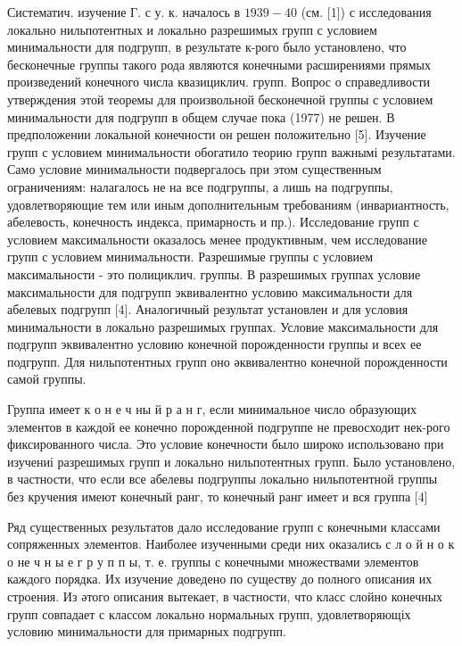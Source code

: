 \documentclass[10pt]{article}
\begin{document}
Систематич. изучение Г. с у. к. началось в $1939-40$ (см. [1]) с исследования локально нильпотентных и локально разрешимых групп с условием минимальности для подгрупп, в результате к-рого было установлено, что бесконечные группы такого рода являются конечными расширениями прямых произведений конечного числа квазициклич. групп. Вопрос о справедливости утверждения этой теоремы для произвольной бесконечной группы с условием минимальности для подгрупп в общем случае пока (1977) не решен. В предположении локальной конечности он решен положительно [5]. Изучение групп с условием минимальности обогатило теорию групп важнымі результатами. Само условие минимальности подвергалось при этом существенным ограничениям: налагалось не на все подгруппы, а лишь на подгруппы, удовлетворяющие тем или иным дополнительным требованиям (инвариантность, абелевость, конечность индекса, примарность и пр.). Исследование групп с условием максимальности оказалось менее продуктивным, чем исследование групп с условием минимальности. Разрешимые группы с условием максимальности - это полициклич. группы. В разрешимых группах условие максимальности для подгрупп эквивалентно условию максимальности для абелевых подгрупп [4]. Аналогичный результат установлен и для условия минимальности в локально разрешимых группах. Условие максимальности для подгрупп эквивалентно условию конечной порожденности группы и всех ее подгрупп. Для нильпотентных групп оно әквивалентно конечной порожденности самой группы.



Группа имеет к о н е ч ны й р а н г, если минимальное число образующих элементов в каждой ее конечно порожденной подгруппе не превосходит нек-рого фиксированного числа. Это условие конечности было широко использовано при изучениі разрешимых групп и локально нильпотентных групп. Было установлено, в частности, что если все абелевы подгруппы локально нильпотентной группы без кручения имеют конечный ранг, то конечный ранг имеет и вся группа [4]



Ряд существенных результатов дало исследование групп с конечными классами сопряженных элементов. Наиболее изученными среди них оказались с л о й н о к о не ч н ы е г р у п п ы, т. е. группы с конечными множествами элементов каждого порядка. Их изучение доведено по существу до полного описания их строения. Из әтого описания вытекает, в частности, что класс слойно конечных групп совпадает с классом локально нормальных групп, удовлетворяющіх условию минимальности для примарных подгрупп.
\end{document}
